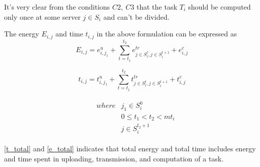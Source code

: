 \documentclass[conference]{IEEEtran}
\begin{document}
 It's very clear from the conditions $C2,\ C3$ that the task $T_i$ should be computed only once at some server $j\in S_i$ and can't be divided. 

  The energy $E_{i,j}$ and time $t_{i,j}$ in the above formulation can be expressed as
\begin{equation} \label{t_total}
E_{i,j}=e^u_{i,j_1}+\sum^{t_2}_{t=t_1}e^{tr}_{{j\in S_i^t},{j\in S_i^{t+1}}} +e^c_{i,j} 
\end{equation}

\begin{equation} \label{e_total}
t_{i,j}=t^u_{i,j_1}+\sum^{t_2}_{t=t_1}t^{tr}_{{j\in S_i^t},{j\in S_i^{t+1}}} +t^c_{i,j} 
\end{equation}

\[ \begin{array}{cc}
\  &  \begin{array}{cc}
where & j_1\in S^0_i \\ 
\  & 0\le t_1<t_2<mt_i \\ 
\  & j \in S^{t_2+1}_i \end{array}
 \end{array}
\] 

\eqref{t_total} and \eqref{e_total} indicates that total energy and total time includes energy and time spent in uploading, transmission, and computation of a task.
\end{document}
